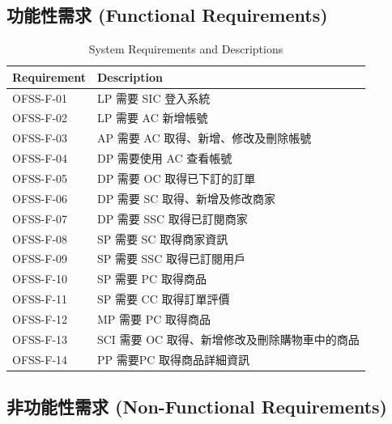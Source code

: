 \documentclass[a4paper, 12pt]{article}
\begin{document}
\subsection{功能性需求 (Functional Requirements)}
\begin{table}[h]
    \centering
    \renewcommand{\arraystretch}{1.35}
    \begin{tabular}{|p{3cm}|p{8cm}|}
        \hline
        \textbf{Requirement} & \textbf{Description} \\
        \hline
        OFSS-F-01 & LP 需要 SIC 登入系統 \\
        \hline
        OFSS-F-02 & LP 需要 AC 新增帳號 \\
        \hline
        OFSS-F-03 & AP 需要 AC 取得、新增、修改及刪除帳號 \\
        \hline 
        OFSS-F-04 & DP 需要使用 AC 查看帳號 \\
        \hline 
        OFSS-F-05 & DP 需要 OC 取得已下訂的訂單 \\
        \hline 
        OFSS-F-06 & DP 需要 SC 取得、新增及修改商家 \\
        \hline 
        OFSS-F-07 & DP 需要 SSC 取得已訂閱商家 \\
        \hline 
        OFSS-F-08 & SP 需要 SC 取得商家資訊 \\
        \hline 
        OFSS-F-09 & SP 需要 SSC 取得已訂閱用戶 \\
        \hline 
        OFSS-F-10 & SP 需要 PC 取得商品 \\
        \hline 
        OFSS-F-11 & SP 需要 CC 取得訂單評價 \\
        \hline 
        OFSS-F-12 & MP 需要 PC 取得商品 \\
        \hline 
        OFSS-F-13 & SCI 需要 OC 取得、新增修改及刪除購物車中的商品 \\
        \hline 
        OFSS-F-14 & PP 需要PC 取得商品詳細資訊 \\
        \hline 
    \end{tabular}
    \caption{System Requirements and Descriptions}
    \label{tab:system-requirements}
\end{table}
\newpage
\subsection{非功能性需求 (Non-Functional Requirements)}
\end{document}
